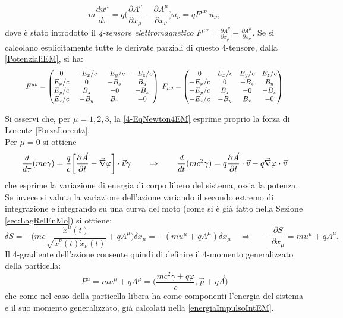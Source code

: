 \begin{equation}
    m\frac{du^\mu}{d\tau}=q\bigg(\frac{\partial A^\nu}{\partial x_\mu}-\frac{\partial A^\mu}{\partial x_\nu}\bigg)u_\nu=qF^{\mu\nu}\ u_\nu,\label{4-EqNewton4EM}
\end{equation}
dove è stato introdotto il \emph{4-tensore elettromagnetico} $F^{\mu\nu}=\frac{\partial A^\nu}{\partial x_\mu}-\frac{\partial A^\mu}{\partial x_\nu}$. Se si calcolano esplicitamente tutte le derivate parziali di questo 4-tensore, dalla \eqref{PotenzialiEM}, si ha:
\begin{equation}
    \label{4-tensoreEM}
    \resizebox{0.9\hsize}{!}{$F^{\mu\nu}=
    \begin{pmatrix}
        0&-E_x/c&-E_y/c&-E_z/c\\
        E_x/c&0&-B_z&B_y\\
        E_y/c&B_z&-0&-B_x\\
        E_z/c&-B_y&B_x&-0\\
 \end{pmatrix}\ 
 F_{\mu\nu}=
 \begin{pmatrix}
     0&E_x/c&E_y/c&E_z/c\\
     -E_x/c&0&-B_z&B_y\\
     -E_y/c&B_z&-0&-B_x\\
     -E_z/c&-B_y&B_x&-0\\
\end{pmatrix}$}
\end{equation}

Si osservi che, per $\mu=1,2,3$, la \eqref{4-EqNewton4EM} esprime proprio la forza di Lorentz \eqref{ForzaLorentz}.\\ Per $\mu=0$ si ottiene
\begin{equation}
    \frac{d}{d\tau}(mc\gamma)=\frac{q}{c}\bigg[\frac{\partial \vec A}{\partial t}-\vec{\nabla} \varphi\bigg]\cdot \vec v\gamma \qquad \Rightarrow \qquad \frac{d}{dt}(mc^2\gamma)=q\frac{\partial \vec A}{\partial t}\cdot \vec v - q\vec{\nabla} \varphi\cdot \vec v
\end{equation}
che esprime la variazione di energia di corpo libero del sistema, ossia la potenza.\\

Se invece si valuta la variazione dell'azione variando il secondo estremo di integrazione e integrando su una curva del moto (come si è già fatto nella Sezione \ref{sec:LagRelEnMo}) si ottiene:
\begin{equation*}
    \delta S=-\bigg(mc\frac{\dot x^\mu(t)}{\sqrt{\dot x^\nu(t)\dot x_\nu(t)}}+qA^\mu\bigg)\delta x_\mu=-(mu^\mu+qA^\mu)\delta x_\mu \quad \Rightarrow \quad -\frac{\partial S}{\partial x_\mu}=mu^\mu+qA^\mu.
\end{equation*}
Il 4-gradiente dell'azione consente quindi di definire il 4-momento generalizzato della particella:
\begin{equation}
    P^\mu=mu^\mu+qA^\mu=\bigg(\frac{mc^2\gamma+q\varphi}{c},\vec p+q\vec A\bigg)
\end{equation}
che come nel caso della particella libera ha come componenti l'energia del sistema e il suo momento generalizzato, già calcolati nella \eqref{energiaImpulsoIntEM}.
